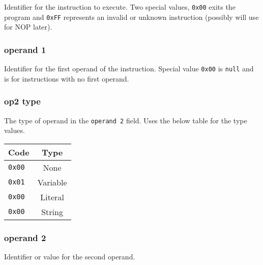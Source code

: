 \documentclass[landscape]{report}
\begin{document}
			Identifier for the instruction to execute. Two special values, \verb|0x00| exits the program and \verb|0xFF| represents an invalid or unknown instruction (possibly will use for NOP later).
			
			\subsubsection*{operand 1}
			
			Identifier for the first operand of the instruction. Special value \verb|0x00| is \verb|null| and is for instructions with no first operand.
			
			\subsubsection*{op2 type}
			
			The type of operand in the \verb|operand 2| field. Uses the below table for the type values.
			
			\vspace{10pt}
			\begin{tabular}{|l|c|}
				\hline 
				\textbf{Code} & \textbf{Type} \\ 
				\hline 
				\verb|0x00| & None \\ 
				\hline 
				\verb|0x01| & Variable \\ 
				\hline 
				\verb|0x00| & Literal \\ 
				\hline 
				\verb|0x00| & String \\ 
				\hline 
			\end{tabular} 
			
			
			\subsubsection*{operand 2}
	
			Identifier or value for the second operand.
	
	
\end{document}
